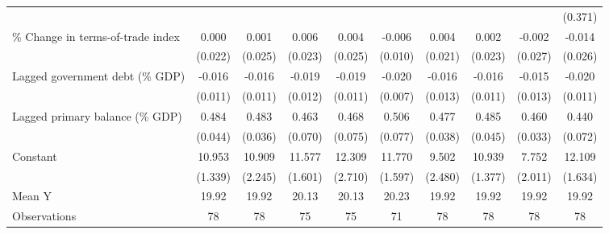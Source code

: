 {\begin{tabular}{l*{9}{c}}
                    &                     &                     &                     &                     &                     &                     &                     &                     &     (0.371)         \\
\addlinespace
\% Change in terms-of-trade index&       0.000         &       0.001         &       0.006         &       0.004         &      -0.006         &       0.004         &       0.002         &      -0.002         &      -0.014         \\
                    &     (0.022)         &     (0.025)         &     (0.023)         &     (0.025)         &     (0.010)         &     (0.021)         &     (0.023)         &     (0.027)         &     (0.026)         \\
\addlinespace
Lagged government debt (\% GDP)&      -0.016         &      -0.016         &      -0.019         &      -0.019         &      -0.020\sym{**} &      -0.016         &      -0.016         &      -0.015         &      -0.020\sym{*}  \\
                    &     (0.011)         &     (0.011)         &     (0.012)         &     (0.011)         &     (0.007)         &     (0.013)         &     (0.011)         &     (0.013)         &     (0.011)         \\
\addlinespace
Lagged primary balance (\% GDP)&       0.484\sym{***}&       0.483\sym{***}&       0.463\sym{***}&       0.468\sym{***}&       0.506\sym{***}&       0.477\sym{***}&       0.485\sym{***}&       0.460\sym{***}&       0.440\sym{***}\\
                    &     (0.044)         &     (0.036)         &     (0.070)         &     (0.075)         &     (0.077)         &     (0.038)         &     (0.045)         &     (0.033)         &     (0.072)         \\
\addlinespace
Constant            &      10.953\sym{***}&      10.909\sym{***}&      11.577\sym{***}&      12.309\sym{***}&      11.770\sym{***}&       9.502\sym{***}&      10.939\sym{***}&       7.752\sym{***}&      12.109\sym{***}\\
                    &     (1.339)         &     (2.245)         &     (1.601)         &     (2.710)         &     (1.597)         &     (2.480)         &     (1.377)         &     (2.011)         &     (1.634)         \\
\midrule
Mean Y              &       19.92         &       19.92         &       20.13         &       20.13         &       20.23         &       19.92         &       19.92         &       19.92         &       19.92         \\
Observations        &          78         &          78         &          75         &          75         &          71         &          78         &          78         &          78         &          78         \\
\bottomrule
\end{tabular}
}
